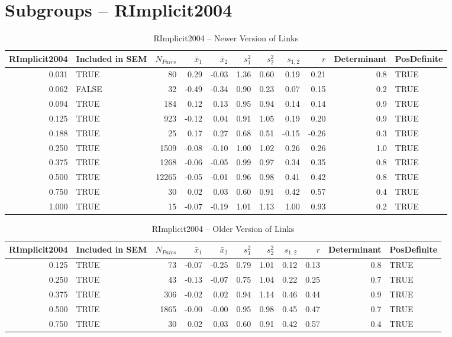 \documentclass{article}\usepackage[]{graphicx}\usepackage[]{color}
\begin{document}
\section{Subgroups --  RImplicit2004 }%
\begin{table}[ht]
\centering
\begin{tabular}{rlrrrrrrrrl}
  \hline
RImplicit2004 & Included in SEM & $N_{Pairs}$ & $\bar{x}_1$ & $\bar{x}_2$ & $s_1^2$ & $s_2^2$ & $s_{1,2}$ & $r$ & Determinant & PosDefinite \\ 
  \hline
0.031 & TRUE & 80 & 0.29 & -0.03 & 1.36 & 0.60 & 0.19 & 0.21 & 0.8 & TRUE \\ 
  0.062 & FALSE & 32 & -0.49 & -0.34 & 0.90 & 0.23 & 0.07 & 0.15 & 0.2 & TRUE \\ 
  0.094 & TRUE & 184 & 0.12 & 0.13 & 0.95 & 0.94 & 0.14 & 0.14 & 0.9 & TRUE \\ 
  0.125 & TRUE & 923 & -0.12 & 0.04 & 0.91 & 1.05 & 0.19 & 0.20 & 0.9 & TRUE \\ 
  0.188 & TRUE & 25 & 0.17 & 0.27 & 0.68 & 0.51 & -0.15 & -0.26 & 0.3 & TRUE \\ 
  0.250 & TRUE & 1509 & -0.08 & -0.10 & 1.00 & 1.02 & 0.26 & 0.26 & 1.0 & TRUE \\ 
  0.375 & TRUE & 1268 & -0.06 & -0.05 & 0.99 & 0.97 & 0.34 & 0.35 & 0.8 & TRUE \\ 
  0.500 & TRUE & 12265 & -0.05 & -0.01 & 0.96 & 0.98 & 0.41 & 0.42 & 0.8 & TRUE \\ 
  0.750 & TRUE & 30 & 0.02 & 0.03 & 0.60 & 0.91 & 0.42 & 0.57 & 0.4 & TRUE \\ 
  1.000 & TRUE & 15 & -0.07 & -0.19 & 1.01 & 1.13 & 1.00 & 0.93 & 0.2 & TRUE \\ 
   \hline
\end{tabular}
\caption{RImplicit2004 -- Newer Version of Links} 
\end{table}
\begin{table}[ht]
\centering
\begin{tabular}{rlrrrrrrrrl}
  \hline
RImplicit2004 & Included in SEM & $N_{Pairs}$ & $\bar{x}_1$ & $\bar{x}_2$ & $s_1^2$ & $s_2^2$ & $s_{1,2}$ & $r$ & Determinant & PosDefinite \\ 
  \hline
0.125 & TRUE & 73 & -0.07 & -0.25 & 0.79 & 1.01 & 0.12 & 0.13 & 0.8 & TRUE \\ 
  0.250 & TRUE & 43 & -0.13 & -0.07 & 0.75 & 1.04 & 0.22 & 0.25 & 0.7 & TRUE \\ 
  0.375 & TRUE & 306 & -0.02 & 0.02 & 0.94 & 1.14 & 0.46 & 0.44 & 0.9 & TRUE \\ 
  0.500 & TRUE & 1865 & -0.00 & -0.00 & 0.95 & 0.98 & 0.45 & 0.47 & 0.7 & TRUE \\ 
  0.750 & TRUE & 30 & 0.02 & 0.03 & 0.60 & 0.91 & 0.42 & 0.57 & 0.4 & TRUE \\ 
   \hline
\end{tabular}
\caption{RImplicit2004 -- Older Version of Links} 
\end{table}
\end{document}
